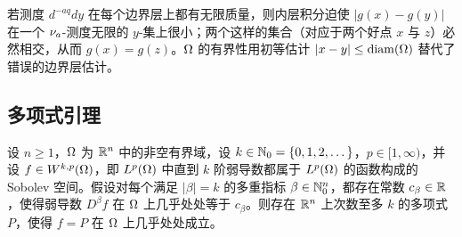 \begin{remark}[直觉]
若测度 $d^{-aq}dy$ 在每个边界层上都有无限质量，则内层积分迫使 $|g(x)-g(y)|$ 在一个 $\nu_{a}$-测度无限的 $y$-集上很小；两个这样的集合（对应于两个好点 $x$ 与 $z$）必然相交，从而 $g(x)=g(z)$。$\Omega$ 的有界性用初等估计 $|x-y|\le\operatorname{diam}(\Omega)$ 替代了错误的边界层估计。
\end{remark}

\subsection{多项式引理}

\begin{lemma}
设 $n\ge 1$，$\Omega$ 为 $\mathbb{R}^n$ 中的非空有界域，设 $k\in\mathbb{N}_0=\{0,1,2,\dots\}$，$p\in[1,\infty)$，并设 $f\in W^{k,p}(\Omega)$，即 $L^p(\Omega)$ 中直到 $k$ 阶弱导数都属于 $L^p(\Omega)$ 的函数构成的 Sobolev 空间。假设对每个满足 $|\beta|=k$ 的多重指标 $\beta\in\mathbb{N}_0^n$，都存在常数 $c_\beta\in\mathbb{R}$，使得弱导数 $D^\beta f$ 在 $\Omega$ 上几乎处处等于 $c_\beta$。则存在 $\mathbb{R}^n$ 上次数至多 $k$ 的多项式 $P$，使得 $f=P$ 在 $\Omega$ 上几乎处处成立。
\end{lemma}

